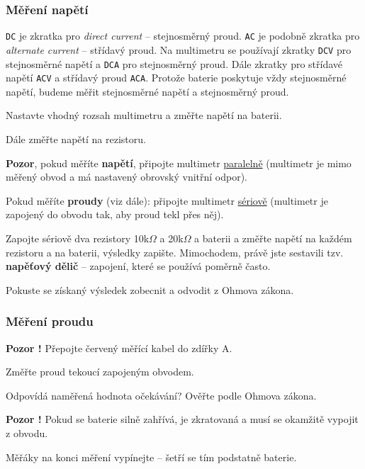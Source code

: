 \subsubsection*{Měření napětí} 

{\tt DC}  je zkratka pro \textit{direct current } -- stejnosměrný proud. 
{\tt AC} je podobně zkratka pro \textit{alternate current} -- střídavý proud.
Na  multimetru se používají zkratky {\tt DCV}  pro stejnosměrné napětí a {\tt DCA} pro stejnosměrný proud. 
Dále zkratky pro střídavé napětí {\tt ACV} a střídavý proud {\tt ACA}. 
Protože baterie poskytuje vždy stejnosměrné napětí, budeme měřit stejnosměrné napětí a stejnosměrný proud.

Nastavte vhodný rozsah multimetru a změřte napětí na baterii. 

Dále změřte napětí na rezistoru.   

\textbf{Pozor}, pokud měříte \textbf{napětí}, připojte multimetr \hyperref[seriove]{paralelně} (multimetr je mimo měřený obvod a má nastavený obrovský vnitřní odpor).

Pokud měříte \textbf{proudy} (viz dále): připojte multimetr \hyperref[seriove]{sériově}  (multimetr je zapojený do obvodu tak, aby proud tekl přes něj).


Zapojte sériově dva rezistory 10k$ \Omega $ a 20k$ \Omega $ a baterii a změřte napětí na každém 
rezistoru a na baterii, výsledky zapište. Mimochodem, právě jste sestavili tzv. \textbf{napěťový dělič} -- zapojení, které se používá poměrně často.

Pokuste se získaný výsledek zobecnit a odvodit z Ohmova zákona.


\subsubsection*{Měření proudu} 

\textbf{Pozor !} Přepojte červený měřící kabel do zdířky A.

Změřte proud tekoucí zapojeným obvodem.

Odpovídá naměřená hodnota očekávání? Ověřte podle Ohmova zákona.


\textbf{Pozor !} Pokud se baterie silně zahřívá, je zkratovaná a musí se okamžitě vypojit z obvodu.

Měřáky na konci měření vypínejte -- šetří se tím podstatně baterie.










